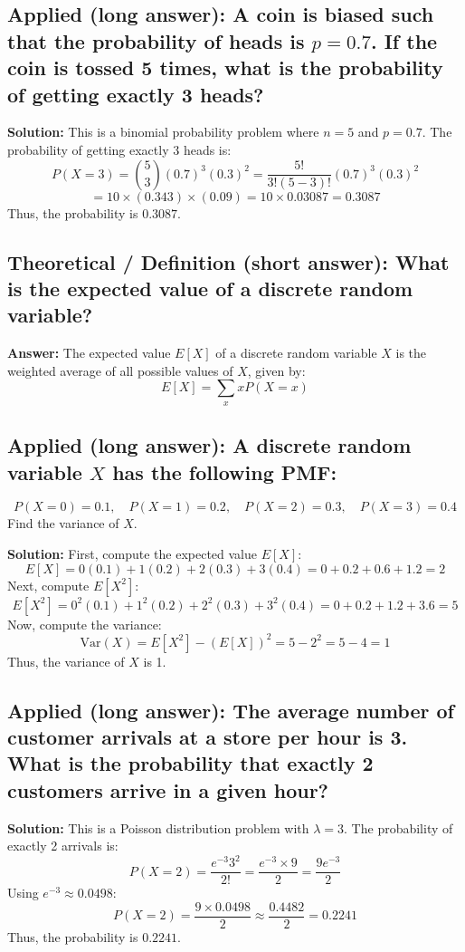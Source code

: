\documentclass[12pt]{article}
\begin{document}
\subsection{Applied (long answer): A coin is biased such that the probability of heads is \( p = 0.7 \). If the coin is tossed 5 times, what is the probability of getting exactly 3 heads?}

\textbf{Solution:}
This is a binomial probability problem where \( n = 5 \) and \( p = 0.7 \). The probability of getting exactly 3 heads is:
\[
P(X = 3) = \binom{5}{3} (0.7)^3 (0.3)^2 = \frac{5!}{3!(5-3)!} (0.7)^3 (0.3)^2
\]
\[
= 10 \times (0.343) \times (0.09) = 10 \times 0.03087 = 0.3087
\]
Thus, the probability is \( 0.3087 \).

\subsection{Theoretical / Definition (short answer): What is the expected value of a discrete random variable?}

\textbf{Answer:} The expected value \( E[X] \) of a discrete random variable \( X \) is the weighted average of all possible values of \( X \), given by:
\[
E[X] = \sum_x x P(X = x)
\]

\subsection{Applied (long answer): A discrete random variable \( X \) has the following PMF:}
\[
P(X = 0) = 0.1, \quad P(X = 1) = 0.2, \quad P(X = 2) = 0.3, \quad P(X = 3) = 0.4
\]
Find the variance of \( X \).

\textbf{Solution:}
First, compute the expected value \( E[X] \):
\[
E[X] = 0(0.1) + 1(0.2) + 2(0.3) + 3(0.4) = 0 + 0.2 + 0.6 + 1.2 = 2
\]
Next, compute \( E[X^2] \):
\[
E[X^2] = 0^2(0.1) + 1^2(0.2) + 2^2(0.3) + 3^2(0.4) = 0 + 0.2 + 1.2 + 3.6 = 5
\]
Now, compute the variance:
\[
\text{Var}(X) = E[X^2] - (E[X])^2 = 5 - 2^2 = 5 - 4 = 1
\]
Thus, the variance of \( X \) is 1.

\subsection{Applied (long answer): The average number of customer arrivals at a store per hour is 3. What is the probability that exactly 2 customers arrive in a given hour?}

\textbf{Solution:}
This is a Poisson distribution problem with \( \lambda = 3 \). The probability of exactly 2 arrivals is:
\[
P(X = 2) = \frac{e^{-3} 3^2}{2!} = \frac{e^{-3} \times 9}{2} = \frac{9e^{-3}}{2}
\]
Using \( e^{-3} \approx 0.0498 \):
\[
P(X = 2) = \frac{9 \times 0.0498}{2} \approx \frac{0.4482}{2} = 0.2241
\]
Thus, the probability is \( 0.2241 \).
\end{document}
